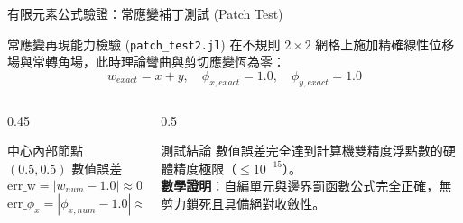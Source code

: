 \begin{frame}{有限元素公式驗證：常應變補丁測試 (Patch Test)}
    \begin{block}{常應變再現能力檢驗 (\texttt{patch\_test2.jl})}
        在不規則 $2 \times 2$ 網格上施加精確線性位移場與常轉角場，此時理論彎曲與剪切應變恆為零：
        $$w_{exact} = x + y, \quad \phi_{x,exact} = 1.0, \quad \phi_{y,exact} = 1.0$$
    \end{block}
    \vfill
    \begin{columns}
        \begin{column}{0.45\textwidth}
            \begin{alertblock}{中心內部節點 $(0.5, 0.5)$ 數值誤差}
                $$\text{err\_w} = |w_{num} - 1.0| \approx \mathbf{0.0 \times 10^{-16}}$$
                $$\text{err\_}\phi_x = |\phi_{x,num} - 1.0| \approx \mathbf{0.0 \times 10^{-16}}$$
            \end{alertblock}
        \end{column}
        \begin{column}{0.5\textwidth}
            \begin{block}{測試結論}
                數值誤差完全達到計算機雙精度浮點數的硬體精度極限（$\le 10^{-15}$）。\\
                \textbf{數學證明}：自編單元與邊界罰函數公式完全正確，無剪力鎖死且具備絕對收斂性。
            \end{block}
        \end{column}
    \end{columns}
\end{frame}